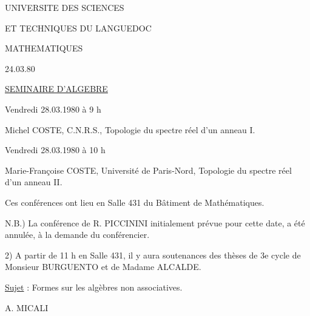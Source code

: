 UNIVERSITE DES SCIENCES

ET TECHNIQUES DU LANGUEDOC

MATHEMATIQUES

24.03.80

\uline{SEMINAIRE D'ALGEBRE}

Vendredi 28.03.1980 à 9 h

Michel COSTE, C.N.R.S., Topologie du spectre réel d'un anneau I.

Vendredi 28.03.1980 à 10 h

Marie-Françoise COSTE, Université de Paris-Nord, Topologie du spectre réel d'un anneau II.

Ces conférences ont lieu en Salle 431 du Bâtiment de Mathématiques.

N.B.) La conférence de R. PICCININI initialement prévue pour cette date, a été annulée, à la demande du conférencier.

2) A partir de 11 h en Salle 431, il y aura  soutenances des thèses de 3e cycle de Monsieur BURGUENTO et de Madame ALCALDE.

\uline{Sujet} : Formes sur les algèbres non associatives.

A. MICALI

